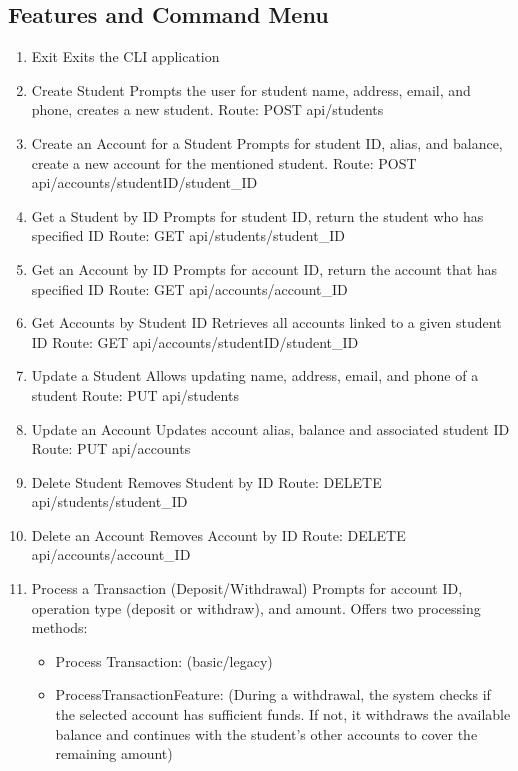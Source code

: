 \documentclass[12pt]{article}
\begin{document}
\subsection{Features and Command Menu}
\begin{enumerate}
	\item[0] Exit
	      \subitem Exits the CLI application
	\item Create Student
	      \subitem Prompts the user for student name, address, email, and phone, creates a new student.
	      \subitem Route: POST api/students
	\item Create an Account for a Student
	      \subitem Prompts for student ID, alias, and balance, create a new account for the mentioned student.
	      \subitem Route: POST api/accounts/studentID/{student\_ID}
	\item Get a Student by ID
	      \subitem Prompts for student ID, return the student who has specified ID
	      \subitem Route: GET api/students/{student\_ID}
	\item Get an Account by ID
	      \subitem Prompts for account ID, return the account that has specified ID
	      \subitem Route: GET api/accounts/{account\_ID}
	\item Get Accounts by Student ID
	      \subitem Retrieves all accounts linked to a given student ID
	      \subitem Route: GET api/accounts/studentID/{student\_ID}
	\item Update a Student
	      \subitem Allows updating name, address, email, and phone of a student
	      \subitem Route: PUT api/students
	\item Update an Account
	      \subitem Updates account alias, balance and associated student ID
	      \subitem Route: PUT api/accounts
	\item Delete Student
	      \subitem Removes Student by ID
	      \subitem Route: DELETE api/students/{student\_ID}
	\item Delete an Account
	      \subitem Removes Account by ID
	      \subitem Route: DELETE api/accounts/{account\_ID}
	\item Process a Transaction (Deposit/Withdrawal)
	      \subitem Prompts for account ID, operation type (deposit or withdraw), and amount. Offers two processing methods:
	      \begin{itemize}
		      \item  Process Transaction: (basic/legacy)
		      \item  ProcessTransactionFeature: (During a withdrawal, the system checks if the selected account has sufficient funds. If not, it withdraws the available balance and continues with the student's other accounts to cover the remaining amount)

\end{itemize}
\end{enumerate}
\end{document}
